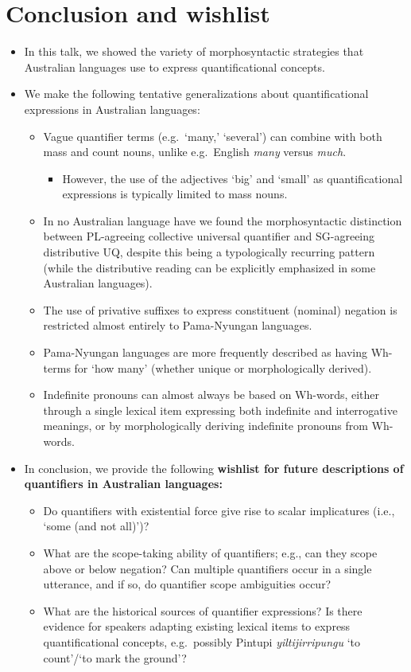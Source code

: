 \documentclass{article}
\begin{document}
\section{Conclusion and wishlist}

\begin{itemize}
\item In this talk, we showed the variety of morphosyntactic strategies that Australian languages use to express quantificational concepts.
\item We make the following tentative generalizations about quantificational expressions in Australian languages:
\begin{itemize}
\item Vague quantifier terms (e.g.\ `many,' `several') can combine with both mass and count nouns, unlike e.g.\ English \textit{many} versus \textit{much}.
\begin{itemize}
    \item However, the use of the adjectives `big' and `small' as quantificational expressions is typically limited to mass nouns.
\end{itemize}
\item In no Australian language have we found the morphosyntactic distinction between PL-agreeing collective universal quantifier and SG-agreeing distributive UQ, despite this being a typologically recurring pattern (while the distributive reading can be explicitly emphasized in some Australian languages). %
\item The use of privative suffixes to express constituent (nominal) negation is restricted almost entirely to Pama-Nyungan languages.
\item Pama-Nyungan languages are more frequently described as having Wh-terms for `how many' (whether unique or morphologically derived).
\item Indefinite pronouns can almost always be based on Wh-words, either through a single lexical item expressing both indefinite and interrogative meanings, or by morphologically deriving indefinite pronouns from Wh-words.
\end{itemize}
    \item In conclusion, we provide the following \textbf{wishlist for future descriptions of quantifiers in Australian languages:}
    \begin{itemize}
        \item Do quantifiers with existential force give rise to scalar implicatures (i.e., `some (and not all)')?
        \item What are the scope-taking ability of quantifiers; e.g., can they scope above or below negation? Can multiple quantifiers occur in a single utterance, and if so, do quantifier scope ambiguities occur?
        \item What are the historical sources of quantifier expressions? Is there evidence for speakers adapting existing lexical items to express quantificational concepts, e.g.\ possibly Pintupi \textit{yiltijirripungu} `to count'/`to mark the ground'?
    \end{itemize}
\end{itemize}

{\small 


}
\end{document}
